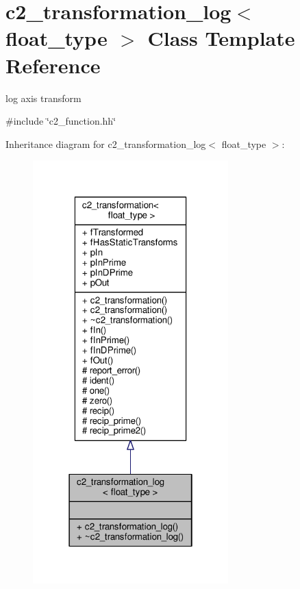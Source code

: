 \hypertarget{classc2__transformation__log}{}\section{c2\+\_\+transformation\+\_\+log$<$ float\+\_\+type $>$ Class Template Reference}
\label{classc2__transformation__log}


log axis transform  




{\ttfamily \#include \char`\"{}c2\+\_\+function.\+hh\char`\"{}}



Inheritance diagram for c2\+\_\+transformation\+\_\+log$<$ float\+\_\+type $>$\+:
\nopagebreak
\begin{figure}[H]
\begin{center}
\leavevmode
\includegraphics[width=214pt]{classc2__transformation__log__inherit__graph}
\end{center}
\end{figure}


